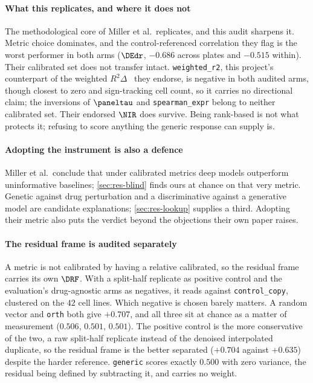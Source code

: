 \paragraph{What this replicates, and where it does not} The methodological core
of Miller et al.\ replicates, and this audit sharpens it. Metric choice
dominates, and the
control-referenced correlation they flag is the worst performer in both arms
($\DEdr$, $-0.686$ across plates and $-0.515$ within). Their calibrated set does
not transfer intact. \texttt{weighted\_r2}, this project's counterpart of the
weighted $R^2\Delta$~\cite{mejia} they endorse, is negative in both audited
arms, though closest to zero and sign-tracking cell count, so it carries no
directional claim; the inversions of $\paneltau$ and \texttt{spearman\_expr}
belong to neither calibrated set. Their endorsed $\NIR$ does survive. Being
rank-based is not what protects it; refusing to score anything the generic
response can supply is.

\paragraph{Adopting the instrument is also a defence} Miller et al.\ conclude
that under calibrated metrics deep models outperform uninformative baselines;
\cref{sec:res-blind} finds ours at chance on that very
metric.
Genetic against drug perturbation and a discriminative against a generative
model are candidate explanations; \cref{sec:res-lookup} supplies a third.
Adopting their metric also puts the verdict beyond the objections their own
paper raises.

\paragraph{The residual frame is audited separately} A metric is not calibrated
by having a relative calibrated, so the residual frame carries its own
$\DRF$. With a split-half replicate as positive control and
the evaluation's drug-agnostic arms as negatives, it reads
 against \texttt{control\_copy}, clustered on the
$42$ cell lines. Which negative is chosen barely matters. A random vector and
\texttt{orth} both give $+0.707$, and all three sit at chance as a matter of
measurement ($0.506$, $0.501$, $0.501$). The positive control is the more
conservative of the two, a raw split-half replicate instead of the denoised
interpolated duplicate, so the residual frame is the better separated ($+0.704$
against $+0.635$) despite the harder reference. \texttt{generic} scores exactly
$0.500$ with zero variance, the residual being defined by subtracting it, and
carries no weight.

